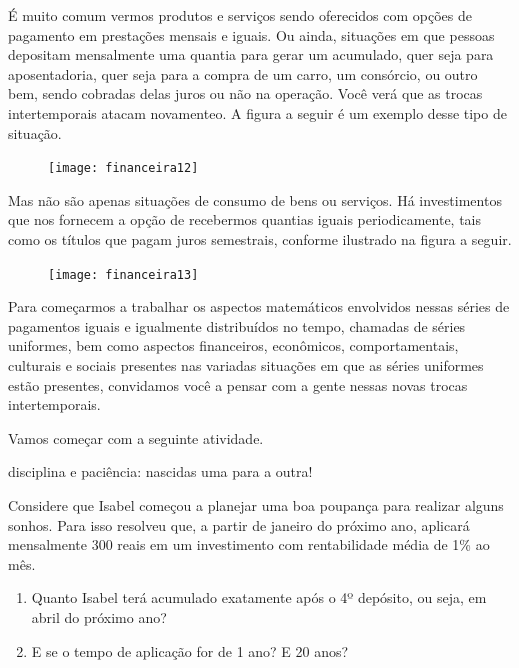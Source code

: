 É muito comum vermos produtos e serviços sendo oferecidos com opções de pagamento em prestações mensais e iguais. Ou ainda, situações em que pessoas depositam mensalmente uma quantia para gerar um acumulado, quer seja para aposentadoria, quer seja para a compra de um carro, um consórcio, ou outro bem, sendo cobradas delas juros ou não na operação. Você verá que as trocas intertemporais atacam novamenteo. A figura a seguir é um exemplo desse tipo de situação.

\begin{figure}[H]
\centering

\texttt{[image: financeira12]}
\end{figure}

Mas não são apenas situações de consumo de bens ou serviços. Há investimentos que nos fornecem a opção de recebermos quantias iguais periodicamente, tais como os títulos que pagam juros semestrais, conforme ilustrado na figura a seguir.

\begin{figure}[H]
\centering

\texttt{[image: financeira13]}
\end{figure}

Para começarmos a trabalhar os aspectos matemáticos envolvidos nessas séries de pagamentos iguais e igualmente distribuídos no tempo, chamadas de séries uniformes, bem como aspectos financeiros, econômicos, comportamentais, culturais e sociais presentes nas variadas situações em que as séries uniformes estão presentes, convidamos você a pensar com a gente nessas novas trocas intertemporais.

Vamos começar com a seguinte atividade.

\begin{task}{disciplina e paciência: nascidas uma para a outra!}

Considere que Isabel começou a planejar uma boa poupança para realizar alguns sonhos. Para isso resolveu que, a partir de janeiro do próximo ano, aplicará mensalmente 300 reais em um investimento com rentabilidade média de 1\% ao mês. 

\begin{enumerate}
\item Quanto Isabel terá acumulado exatamente após o 4º depósito, ou seja, em abril do próximo ano?
\item E se o tempo de aplicação for de 1 ano? E 20 anos?
\end{enumerate} 

\end{task}

